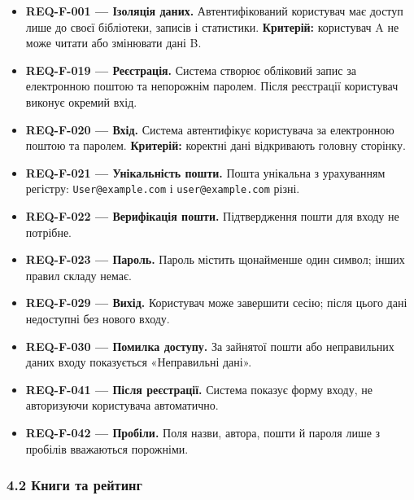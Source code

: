 \documentclass[
]{article}
\providecommand{\tightlist}{%
  \setlength{\itemsep}{0pt}\setlength{\parskip}{0pt}}
\begin{document}
\begin{itemize}
\tightlist
\item
  \textbf{REQ-F-001 --- Ізоляція даних.} Автентифікований користувач має
  доступ лише до своєї бібліотеки, записів і статистики.
  \textbf{Критерій:} користувач A не може читати або змінювати дані B.
\item
  \textbf{REQ-F-019 --- Реєстрація.} Система створює обліковий запис за
  електронною поштою та непорожнім паролем. Після реєстрації користувач
  виконує окремий вхід.
\item
  \textbf{REQ-F-020 --- Вхід.} Система автентифікує користувача за
  електронною поштою та паролем. \textbf{Критерій:} коректні дані
  відкривають головну сторінку.
\item
  \textbf{REQ-F-021 --- Унікальність пошти.} Пошта унікальна з
  урахуванням регістру: \texttt{User@example.com} і
  \texttt{user@example.com} різні.
\item
  \textbf{REQ-F-022 --- Верифікація пошти.} Підтвердження пошти для
  входу не потрібне.
\item
  \textbf{REQ-F-023 --- Пароль.} Пароль містить щонайменше один символ;
  інших правил складу немає.
\item
  \textbf{REQ-F-029 --- Вихід.} Користувач може завершити сесію; після
  цього дані недоступні без нового входу.
\item
  \textbf{REQ-F-030 --- Помилка доступу.} За зайнятої пошти або
  неправильних даних входу показується «Неправильні дані».
\item
  \textbf{REQ-F-041 --- Після реєстрації.} Система показує форму входу,
  не авторизуючи користувача автоматично.
\item
  \textbf{REQ-F-042 --- Пробіли.} Поля назви, автора, пошти й пароля
  лише з пробілів вважаються порожніми.
\end{itemize}

\hypertarget{42-ux43aux43dux438ux433ux438-ux442ux430-ux440ux435ux439ux442ux438ux43dux433}{%
\subsubsection{4.2 Книги та
рейтинг}\label{42-ux43aux43dux438ux433ux438-ux442ux430-ux440ux435ux439ux442ux438ux43dux433}}
\end{document}
